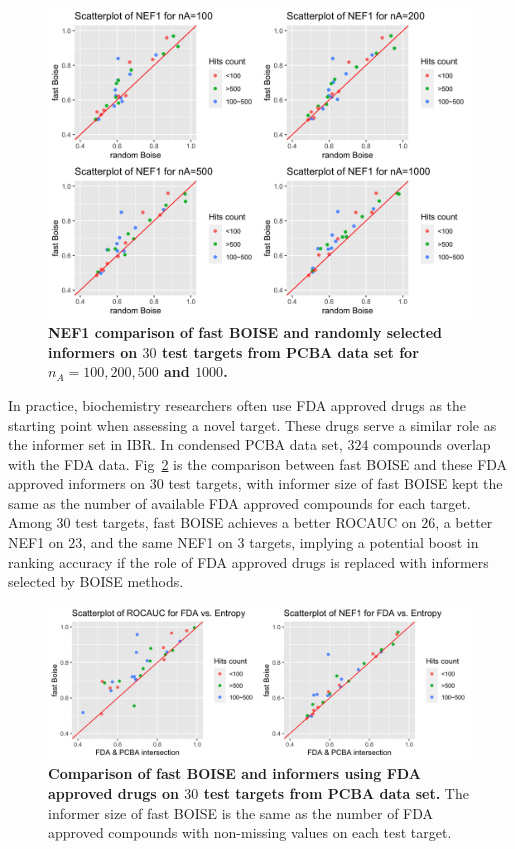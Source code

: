 \documentclass[11pt,a4paper]{article}
\theoremstyle{plain}
\begin{document}
\begin{figure}[!ht]
\centering
\includegraphics[width=5.0in]{Figs/random_entropy_nef1_compar.png}
\caption{\label{fig:pcba_fast_random_nef} 
{\bf NEF1 comparison of fast BOISE and randomly selected informers on $30$ test targets from PCBA data set for $n_A = 100, 200, 500$ and $1000$. }}
\end{figure}

In practice, biochemistry researchers often use FDA approved drugs as the starting point when assessing a novel target. These drugs serve a similar role as the informer set in IBR. In condensed PCBA data set, $324$ compounds overlap with the FDA data. Fig~\ref{fig:pcba_fast_fda} is the comparison between fast BOISE and these FDA approved informers on $30$ test targets, with informer size of fast BOISE kept the same as the number of available FDA approved compounds for each target. Among $30$ test targets, fast BOISE achieves a better ROCAUC on $26$, a better NEF1 on $23$, and the same NEF1 on $3$ targets, implying a potential boost in ranking accuracy if the role of FDA approved drugs is replaced with informers selected by BOISE methods. 

\begin{figure}[!ht]
\centering
\includegraphics[width=5.0in]{Figs/fda_entropy_compar.png}
\caption{\label{fig:pcba_fast_fda} 
{\bf Comparison of fast BOISE and informers using FDA approved drugs on $30$ test targets from PCBA data set.} The informer size of fast BOISE is the same as the number of FDA approved compounds with non-missing values on each test target.}
\end{figure}
\end{document}
